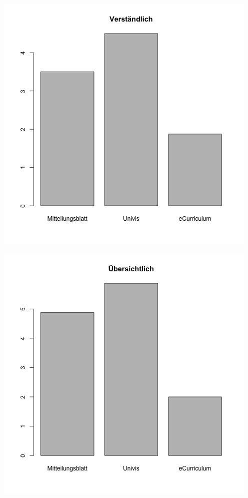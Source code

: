 \documentclass[a4paper,10pt]{scrartcl}
\begin{document}
\begin{center}
 \includegraphics[width=\linewidth]{./Appendix/Plots/Barplots/barplot3.png}
\end{center}
\begin{center}
 \includegraphics[width=\linewidth]{./Appendix/Plots/Barplots/barplot4.png}
\end{center}
\end{document}
